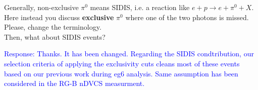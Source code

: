 \begin{itemize}
 Generally, non-exclusive $\pi^0$ means SIDIS, i.e. a reaction like 
 $e+p\rightarrow e+\pi^0+X$. Here instead you discuss \textbf{exclusive} 
 $\pi^0$ where one of the two photons is missed. Please, change the 
 terminology. \\ Then, what about SIDIS events?
  
  
  \textcolor{blue}{Response: Thanks. It has been changed. Regarding the SIDIS 
  condtribution, our selection criteria of applying the exclusivity cuts cleans 
  most of these events based on our previous work during eg6 analysis. Same 
  assumption has been considered in the RG-B nDVCS measurment.}
  
 \end{itemize}
